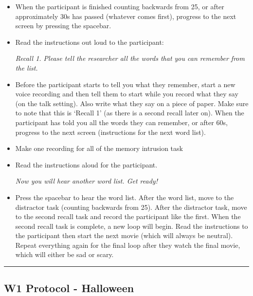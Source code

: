 \documentclass[
]{book}
\begin{document}
\begin{itemize}
\item
  When the participant is finished counting backwards from 25, or after approximately 30s has passed (whatever comes first), progress to the next screen by pressing the spacebar.
\item
  Read the instructions out loud to the participant:

  \emph{Recall 1. Please tell the researcher all the words that you can remember from the list.}
\item
  Before the participant starts to tell you what they remember, start a new voice recording and then tell them to start while you record what they say (on the talk setting). Also write what they say on a piece of paper. Make sure to note that this is `Recall 1' (as there is a second recall later on). When the participant has told you all the words they can remember, or after 60s, progress to the next screen (instructions for the next word list).
\item
  Make one recording for all of the memory intrusion task
\item
  Read the instructions aloud for the participant.

  \emph{Now you will hear another word list. Get ready!}
\item
  Press the spacebar to hear the word list. After the word list, move to the distractor task (counting backwards from 25). After the distractor task, move to the second recall task and record the participant like the first. When the second recall task is complete, a new loop will begin. Read the instructions to the participant then start the next movie (which will always be neutral). Repeat everything again for the final loop after they watch the final movie, which will either be sad or scary.
\end{itemize}

\begin{center}\rule{0.5\linewidth}{0.5pt}\end{center}

\hypertarget{w1-protocol---halloween}{%
\subsection{W1 Protocol - Halloween}\label{w1-protocol---halloween}}
\end{document}
